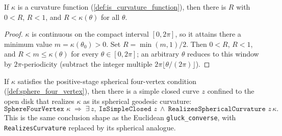 \begin{lemma}
  \label{lem:sphere_curvature_lower_bound}
  If $\kappa$ is a curvature function (\cref{def:is_curvature_function}), then there is $R$
  with $0<R$, $R<1$, and $R<\kappa(\theta)$ for all $\theta$.
\end{lemma}

\begin{proof}

\leanok
  $\kappa$ is continuous on the compact interval $[0,2\pi]$, so it attains there a minimum
  value $m=\kappa(\theta_0)>0$. Set $R=\min(m,1)/2$. Then $0<R$, $R<1$, and
  $R<m\le\kappa(\theta)$ for every $\theta\in[0,2\pi]$; an arbitrary $\theta$ reduces to
  this window by $2\pi$-periodicity (subtract the integer multiple
  $2\pi\lfloor\theta/(2\pi)\rfloor$).
\end{proof}

\begin{theorem}
  \label{thm:spherical_converse_pos}
  If $\kappa$ satisfies the positive-stage spherical four-vertex condition
  (\cref{def:sphere_four_vertex}), then there is a simple closed curve $z$ confined to the
  open disk that realizes $\kappa$ as its spherical geodesic curvature:
  \[
    \texttt{SphereFourVertex }\kappa \;\Longrightarrow\;
    \exists\,z,\ \texttt{IsSimpleClosed }z\ \wedge\ \texttt{RealizesSphericalCurvature }z\,\kappa .
  \]
  This is the same conclusion shape as the Euclidean \texttt{gluck\_converse}, with
  \texttt{RealizesCurvature} replaced by its spherical analogue.
\end{theorem}

